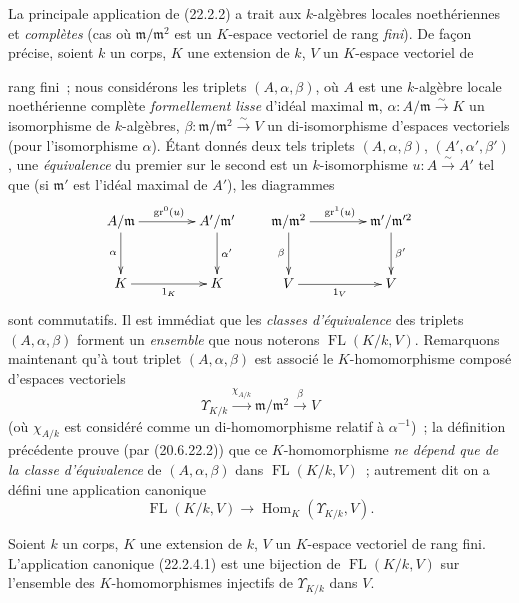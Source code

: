 \begin{env}[22.2.4]
\label{0.22.2.4-fr}
La principale application de (22.2.2) a trait aux $k$-algèbres locales
noethériennes et \emph{complètes} (cas où $\mathfrak m/\mathfrak m^2$ est un
$K$-espace vectoriel de rang \emph{fini}). De façon précise, soient $k$ un
corps, $K$ une extension de $k$, $V$ un $K$-espace vectoriel de


rang fini~; nous considérons les triplets $(A,\alpha,\beta)$, où $A$ est une
$k$-algèbre locale noethérienne complète \emph{formellement lisse} d'idéal
maximal $\mathfrak m$, $\alpha:A/\mathfrak m\xrightarrow{\sim}K$ un
isomorphisme de $k$-algèbres,
$\beta:\mathfrak m/\mathfrak m^2\xrightarrow{\sim}V$ un di-isomorphisme
d'espaces vectoriels (pour l'isomorphisme $\alpha$). Étant donnés deux tels
triplets $(A,\alpha,\beta)$, $(A',\alpha',\beta')$, une \emph{équivalence} du
premier sur le second est un $k$-isomorphisme $u:A\xrightarrow{\sim}A'$ tel
que (si $\mathfrak m'$ est l'idéal maximal de $A'$), les diagrammes
\[
\xymatrix@C=4em@R=3em{
  A/\mathfrak m \ar[r]^{\operatorname{gr}^0(u)} \ar[d]_{\alpha} &
  A'/\mathfrak m' \ar[d]^{\alpha'} \\
  K \ar[r]_{1_K} & K
}
\qquad
\xymatrix@C=4em@R=3em{
  \mathfrak m/\mathfrak m^2 \ar[r]^{\operatorname{gr}^1(u)}
    \ar[d]_{\beta} &
  \mathfrak m'/\mathfrak m'^2 \ar[d]^{\beta'} \\
  V \ar[r]_{1_V} & V
}
\]
sont commutatifs. Il est immédiat que les \emph{classes d'équivalence} des
triplets $(A,\alpha,\beta)$ forment un \emph{ensemble} que nous noterons
$\operatorname{FL}(K/k,V)$. Remarquons maintenant qu'à tout triplet
$(A,\alpha,\beta)$ est associé le $K$-homomorphisme composé d'espaces
vectoriels
\[
  \Upsilon_{K/k}\xrightarrow{\chi_{A/k}}
  \mathfrak m/\mathfrak m^2\xrightarrow{\beta}V
\]
(où $\chi_{A/k}$ est considéré comme un di-homomorphisme relatif à
$\alpha^{-1}$)~; la définition précédente prouve (par (20.6.22.2)) que ce
$K$-homomorphisme \emph{ne dépend que de la classe d'équivalence} de
$(A,\alpha,\beta)$ dans $\operatorname{FL}(K/k,V)$~; autrement dit on a
défini une application canonique
\begin{equation}
\tag{22.2.4.1}
\label{0.22.2.4.1-fr}
  \operatorname{FL}(K/k,V)\longrightarrow
  \operatorname{Hom}_K(\Upsilon_{K/k},V).
\end{equation}
\end{env}

\begin{proposition}[22.2.5]
\label{0.22.2.5-fr}
Soient $k$ un corps, $K$ une extension de $k$, $V$ un $K$-espace vectoriel
de rang fini. L'application canonique (22.2.4.1) est une bijection de
$\operatorname{FL}(K/k,V)$ sur l'ensemble des $K$-homomorphismes injectifs
de $\Upsilon_{K/k}$ dans $V$.
\end{proposition}

